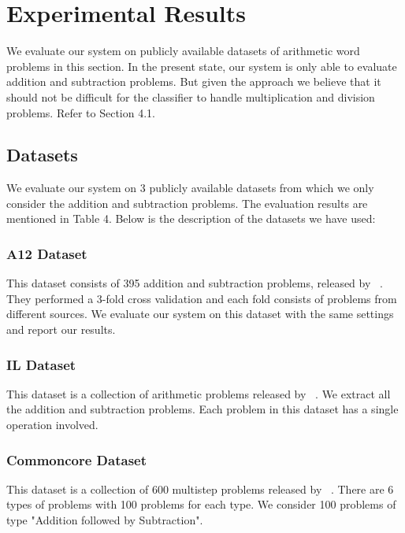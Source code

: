 \documentclass[11pt]{article}
\begin{document}
\newpage
\section{Experimental Results}

We evaluate our system on publicly available datasets of arithmetic word problems in this section. In the present state, our system is only able to evaluate addition and subtraction problems. But given the approach we believe that it should not be difficult for the classifier to handle multiplication and division problems. Refer to Section 4.1.

\subsection{Datasets}
We evaluate our system on 3 publicly available datasets from which we only consider the addition and subtraction problems. The evaluation results are mentioned in Table 4. Below is the description of the datasets we have used:

\subsubsection{A12 Dataset}
This dataset consists of 395 addition and subtraction problems, released by ~\cite{Hosseini:14}. They performed a 3-fold cross validation and each fold consists of problems from different sources. We evaluate our system on this dataset with the same settings and report our results.

\subsubsection{IL Dataset}
This dataset is a collection of arithmetic problems released by ~\cite{Roy:15}. We extract all the addition and subtraction problems. Each problem in this dataset has a single operation involved.

\subsubsection{Commoncore Dataset}
This dataset is a collection of 600 multistep problems released by ~\cite{Roy:15}. There are 6 types of problems with 100 problems for each type. We consider 100 problems of type "Addition followed by Subtraction".\newline
\end{document}

